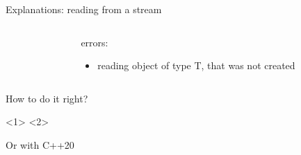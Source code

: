 \documentclass{panicsoftware-presentation}
\makeatletter
\newenvironment{itemizeSeq}{\begin{itemize}[<+-|alert@+>]}{\end{itemize}}
\makeatother
\begin{document}
\begin{frame}{Explanations: reading from a stream}

\begin{columns}[t]

\begin{column}{0.48\linewidth}
\inputminted{\myCpp}{examples/invalid-reinterpret-cast.cpp}
\end{column}

\begin{column}{0.48\linewidth}
\centerline{\alert{errors:}}

\begin{itemizeSeq}
\item reading object of type T, that was not created
\end{itemizeSeq}
\end{column}

\end{columns}

\end{frame}

\begin{frame}{How to do it right?}

<1>
<2>


\end{frame}

\begin{frame}{Or with C++20}
\inputminted[highlightlines={9}]{\myCpp}{examples/invalid-reinterpret-cast-right-modern.cpp}
\end{frame}
\end{document}
